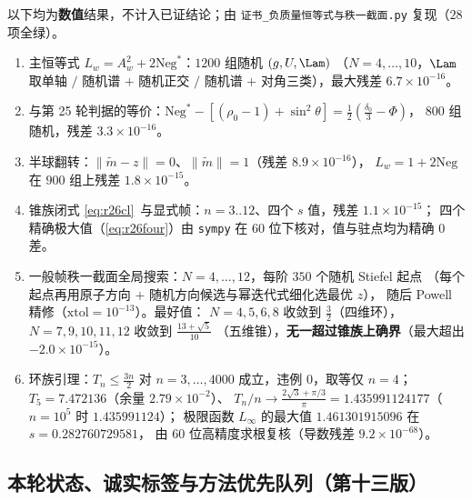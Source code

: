 以下均为\textbf{数值}结果，不计入已证结论；由
\texttt{证书\_负质量恒等式与秩一截面.py} 复现（$28$ 项全绿）。
\begin{enumerate}\itemsep2pt
\item 主恒等式 $L_w=A_w^2+2\mathrm{Neg}^*$：$1200$ 组随机 $(g,U,\Lam)$
（$N=4,\dots,10$，$\Lam$ 取单轴 $/$ 随机谱 $+$ 随机正交 $/$ 随机谱 $+$ 对角三类），最大残差 $6.7\times10^{-16}$。
\item 与第 25 轮判据的等价：$\mathrm{Neg}^*-[(\rho_0-1)+\sin^2\theta]=\frac12(\frac{\delta_0}3-\Phi)$，
$800$ 组随机，残差 $3.3\times10^{-16}$。
\item 半球翻转：$\|\widetilde m-z\|=0$、$\|\widetilde m\|=1$（残差 $8.9\times10^{-16}$），
$L_w=1+2\mathrm{Neg}$ 在 $900$ 组上残差 $1.8\times10^{-15}$。
\item 锥族闭式 \eqref{eq:r26cl}~与显式帧：$n=3..12$、四个 $s$ 值，残差 $1.1\times10^{-15}$；
四个精确极大值（\eqref{eq:r26four}）由 \texttt{sympy} 在 $60$ 位下核对，值与驻点均为精确 $0$ 差。
\item 一般帧秩一截面全局搜索：$N=4,\dots,12$，每阶 $350$ 个随机 Stiefel 起点
（每个起点再用原子方向 $+$ 随机方向候选与幂迭代式细化选最优 $z$），
随后 Powell 精修（$\mathrm{xtol}=10^{-13}$）。最好值：
$N=4,5,6,8$ 收敛到 $\frac32$（四维环），$N=7,9,10,11,12$ 收敛到 $\frac{13+\sqrt5}{10}$
（五维锥），\textbf{无一超过锥族上确界}（最大超出 $-2.0\times10^{-15}$）。
\item 环族引理：$T_n\le\frac{3n}2$ 对 $n=3,\dots,4000$ 成立，违例 $0$，取等仅 $n=4$；
$T_5=7.472136$（余量 $2.79\times10^{-2}$）、
 $T_n/n\to\frac{2\sqrt3+\pi/3}{\pi}=1.435991124177$（$n=10^5$ 时 $1.435991124$）；
 极限函数 $L_\infty$ 的最大值 $1.461301915096$ 在 $s=0.282760729581$，
 由 $60$ 位高精度求根复核（导数残差 $9.2\times10^{-68}$）。
\end{enumerate}

\subsection{本轮状态、诚实标签与方法优先队列（第十三版）}\label{sec:r26:status}

